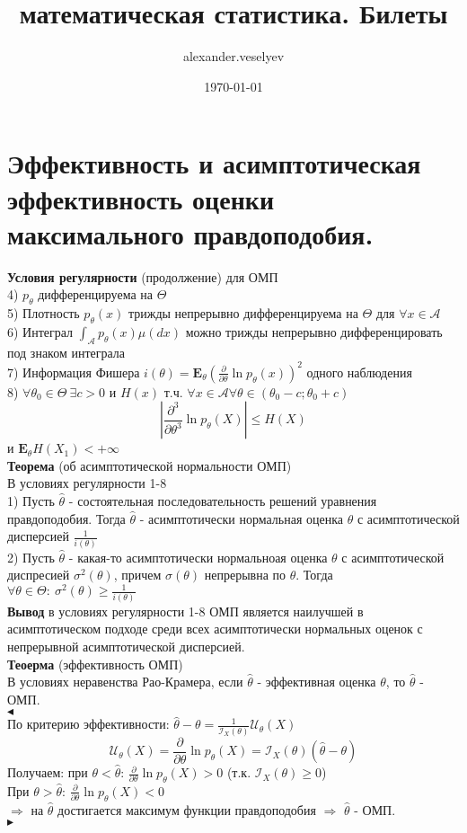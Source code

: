 \documentclass{article}
\title{математическая статистика. Билеты}
\author{alexander.veselyev }
\date{\today}
\begin{document}
\section{Эффективность и асимптотическая эффективность оценки максимального правдоподобия.}
\textbf{Условия регулярности} (продолжение) для ОМП\\
4) $p_\theta$ дифференцируема на $\Theta$\\
5) Плотность $p_\theta(x)$ трижды непрерывно дифференцируема на $\Theta$ для $\forall x\in\mathcal{A}$\\
6) Интеграл $\int_\mathcal{A}{p_\theta(x)\mu(dx)}$ можно трижды непрерывно дифференцировать под знаком интеграла\\
7) Информация Фишера $i(\theta) = \mathbf{E}_\theta\left(\frac{\partial}{\partial\theta}\ln{p_\theta(x)}\right)^2$ одного наблюдения\\
8) $\forall\theta_0\in\Theta\ \exists c>0$ и $H(x)$ т.ч. $\forall x\in\mathcal{A} \forall \theta\in(\theta_0-c;\theta_0+c)$
$$ \left| \frac{\partial^3}{\partial\theta^3}\ln{p_\theta(X)}\right| \leq H(X) $$
и $\mathbf{E}_\theta H(X_1) < +\infty$\\
\textbf{Теорема} (об асимптотической нормальности ОМП)\\
В условиях регулярности 1-8\\
1) Пусть $\widehat{\theta}$ - состоятельная последовательность решений уравнения правдоподобия. Тогда $\widehat{\theta}$ - асимптотически нормальная оценка $\theta$ с асимптотической дисперсией $\frac{1}{i(\theta)}$ \\
2) Пусть $\widehat{\theta}$ - какая-то асимптотически нормальноая оценка $\theta$ с асимптотической диспресией $\sigma^2(\theta)$, причем $\sigma(\theta)$ непрерывна по $\theta$. Тогда $\forall\theta
\in \Theta:\ \sigma^2(\theta) \geq \frac{1}{i(\theta)}$\\
\textbf{Вывод} в условиях регулярности 1-8 ОМП является наилучшей в асимптотическом подходе среди всех асимптотически нормальных оценок с непрерывной асимптотической дисперсией.\\
\textbf{Теоерма} (эффективность ОМП)\\
В условиях неравенства Рао-Крамера, если $\widehat{\theta}$ - эффективная оценка $\theta$, то $\widehat{\theta}$ - ОМП.\\
$\blacktriangleleft$
\\
По критерию эффективности: $\widehat{\theta} - \theta = \frac{1}{\mathcal{I}_X(\theta)}\mathcal{U}_\theta(X)$\\
$$\mathcal{U}_\theta(X) = \frac{\partial}{\partial\theta}\ln{p_\theta(X)} = \mathcal{I}_X(\theta)(\widehat{\theta} - \theta) $$
Получаем: при $\theta < \widehat{\theta}$: $\frac{\partial}{\partial\theta}\ln{p_\theta(X)} > 0$ 
(т.к. $\mathcal{I}_X(\theta) \geq 0$)\\ 
При $\theta > \widehat{\theta}$: $\frac{\partial}{\partial\theta}\ln{p_\theta(X)} < 0$\\
$\Rightarrow$ на $\widehat{\theta}$ достигается максимум функции правдоподобия $\Rightarrow$ $\widehat{\theta}$ - ОМП.\\
$\blacktriangleright$
\end{document}
